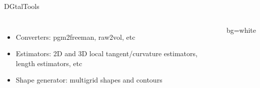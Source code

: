 \documentclass[noamsthm, pdftex, french]{beamer}
\begin{document}
\begin{frame}
\begin{columns}
\begin{alertblock}{\centering DGtalTools}
      
        \begin{minipage}{\textwidth}
          \begin{columns}[onlytextwidth]
            \begin{itemize}
            \item Converters: pgm2freeman, raw2vol, etc
            \item Estimators: 2D and 3D local tangent/curvature estimators, length estimators, etc
            \item Shape generator: multigrid shapes and contours
            \end{itemize}
            \begin{beamercolorbox}{bg=white}
            \end{beamercolorbox}
            \end{columns}
        \end{minipage}
        \begin{itemize}
      

\end{itemize}
\end{alertblock}
\end{columns}
\end{frame}
\end{document}

